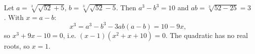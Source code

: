 Let $a=\sqrt[3]{\sqrt{52}+5}$, $b=\sqrt[3]{\sqrt{52}-5}$. Then $a^3-b^3=10$ and $ab=\sqrt[3]{52-25}=3$. With $x=a-b$:
\[x^3=a^3-b^3-3ab(a-b)=10-9x,\]
so $x^3+9x-10=0$, i.e. $(x-1)(x^2+x+10)=0$. The quadratic has no real roots, so $x=\boxed{1}$.
